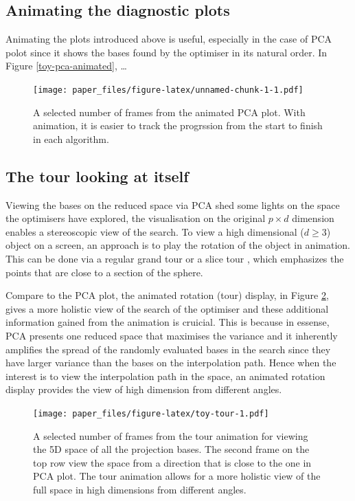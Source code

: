 \documentclass[12pt]{article}
\begin{document}
\hypertarget{animating-the-diagnostic-plots}{%
\subsection{Animating the diagnostic plots}\label{animating-the-diagnostic-plots}}

Animating the plots introduced above is useful, especially in the case of PCA polot since it shows the bases found by the optimiser in its natural order. In Figure \ref{toy-pca-animated}, \ldots{}

\begin{figure}
\centering
\texttt{[image: paper\_files/figure-latex/unnamed-chunk-1-1.pdf]}
\caption{\label{fig:unnamed-chunk-1}\label{toy-pca-aniamted}A selected number of frames from the animated PCA plot. With animation, it is easier to track the progrssion from the start to finish in each algorithm.}
\end{figure}

\hypertarget{the-tour-looking-at-itself}{%
\subsection{The tour looking at itself}\label{the-tour-looking-at-itself}}

Viewing the bases on the reduced space via PCA shed some lights on the space the optimisers have explored, the visualisation on the original \(p \times d\) dimension enables a stereoscopic view of the search. To view a high dimensional (\(d \ge 3\)) object on a screen, an approach is to play the rotation of the object in animation. This can be done via a regular grand tour or a slice tour \citep{laa2020slice}, which emphasizes the points that are close to a section of the sphere.

Compare to the PCA plot, the animated rotation (tour) display, in Figure \ref{toy-tour}, gives a more holistic view of the search of the optimiser and these additional information gained from the animation is cruicial. This is because in essense, PCA presents one reduced space that maximises the variance and it inherently amplifies the spread of the randomly evaluated bases in the search since they have larger variance than the bases on the interpolation path. Hence when the interest is to view the interpolation path in the space, an animated rotation display provides the view of high dimension from different angles.

\begin{figure}
\centering
\texttt{[image: paper\_files/figure-latex/toy-tour-1.pdf]}
\caption{\label{fig:toy-tour}\label{toy-tour}A selected number of frames from the tour animation for viewing the 5D space of all the projection bases. The second frame on the top row view the space from a direction that is close to the one in PCA plot. The tour animation allows for a more holistic view of the full space in high dimensions from different angles.}
\end{figure}
\end{document}
